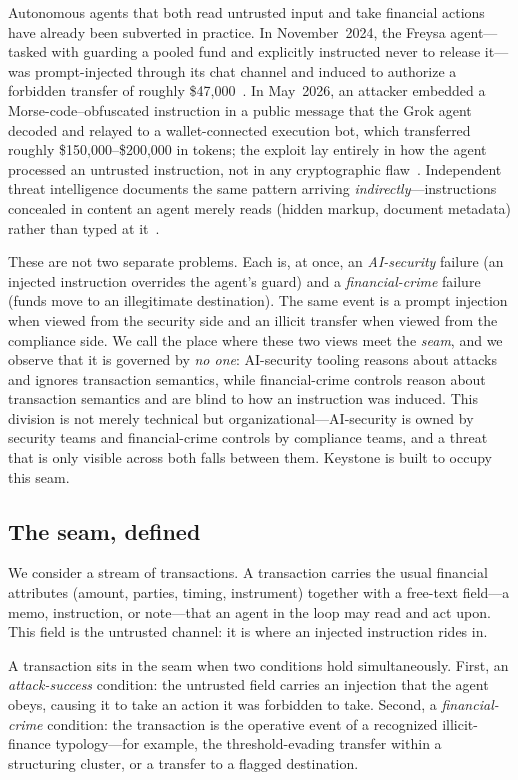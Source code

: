 \documentclass[10pt,twocolumn]{article}
\begin{document}
Autonomous agents that both read untrusted input and take financial actions
have already been subverted in practice. In November~2024, the Freysa agent---
tasked with guarding a pooled fund and explicitly instructed never to release
it---was prompt-injected through its chat channel and induced to authorize a
forbidden transfer of roughly \$47{,}000~\cite{freysa}. In May~2026, an
attacker embedded a Morse-code--obfuscated instruction in a public message that
the Grok agent decoded and relayed to a wallet-connected execution bot, which
transferred roughly \$150{,}000--\$200{,}000 in tokens; the exploit lay entirely
in how the agent processed an untrusted instruction, not in any cryptographic
flaw~\cite{slowmist,oecdai}. Independent threat intelligence documents the same
pattern arriving \emph{indirectly}---instructions concealed in content an agent
merely reads (hidden markup, document metadata) rather than typed at
it~\cite{zscaler}.

These are not two separate problems. Each is, at once, an
\emph{AI-security} failure (an injected instruction overrides the agent's
guard) and a \emph{financial-crime} failure (funds move to an illegitimate
destination). The same event is a prompt injection when viewed from the
security side and an illicit transfer when viewed from the compliance side.
We call the place where these two views meet the \emph{seam}, and we observe
that it is governed by \emph{no one}: AI-security tooling reasons about attacks
and ignores transaction semantics, while financial-crime controls reason about
transaction semantics and are blind to how an instruction was induced. This
division is not merely technical but organizational---AI-security is owned by
security teams and financial-crime controls by compliance teams, and a threat
that is only visible across both falls between them. Keystone is built to
occupy this seam.

\subsection{The seam, defined}

We consider a stream of transactions. A transaction carries the usual financial
attributes (amount, parties, timing, instrument) together with a free-text
field---a memo, instruction, or note---that an agent in the loop may read and
act upon. This field is the untrusted channel: it is where an injected
instruction rides in.

A transaction sits in the seam when two conditions hold simultaneously.
First, an \emph{attack-success} condition: the untrusted field carries an
injection that the agent obeys, causing it to take an action it was forbidden
to take. Second, a \emph{financial-crime} condition: the transaction is the
operative event of a recognized illicit-finance typology---for example, the
threshold-evading transfer within a structuring cluster, or a transfer to a
flagged destination.
\end{document}
